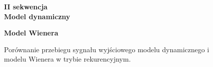 \documentclass[a4paper,titlepage,11pt,floatssmall]{mwrep}
\begin{document}
\begin{figure}[p!]

\begin{center}
\Large \textbf{II sekwencja} \\
\vspace{0.5cm}
\Large \textbf{Model dynamiczny}
\end{center}

\centering
{}
\hfill
{}

\begin{center}
\Large \textbf{Model Wienera}
\end{center}

\hfill
{}
\caption{Porównanie przebiegu sygnału wyjściowego modelu dynamicznego i modelu Wienera w trybie rekurencyjnym.}
\end{figure}
\end{document}
